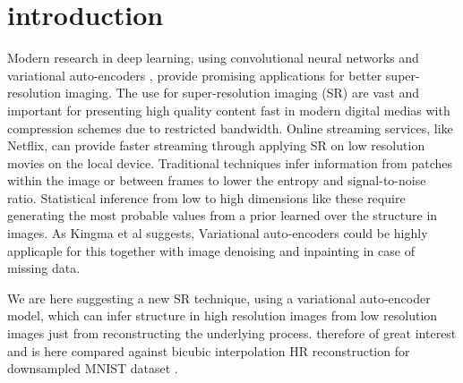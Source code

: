 \section{introduction}
\label{sec:introduction}
Modern research in deep learning, using convolutional neural networks \cite{Dong15} and variational auto-encoders \cite{Kingma2013} \cite{Johnson16}, provide promising applications for better super-resolution imaging.  
The use for super-resolution imaging (SR) are vast and important for presenting high quality content fast in modern digital medias with compression schemes due to restricted bandwidth. Online streaming services, like Netflix, can provide faster streaming through applying SR on low resolution movies on the local device. Traditional techniques infer information from patches within the image or between frames to lower the entropy and signal-to-noise ratio. 
Statistical inference from low to high dimensions like these require generating the most probable values from a prior learned over the structure in images. As Kingma et al \cite{Kingma2013} suggests, Variational auto-encoders could be highly applicaple for this together with image denoising and inpainting in case of missing data.

We are here suggesting a new SR technique, using a variational auto-encoder model, which can infer structure in high resolution images from low resolution images just from reconstructing the underlying process. therefore of great interest and is here compared against bicubic interpolation HR reconstruction for downsampled MNIST dataset \cite{MNIST}.
 